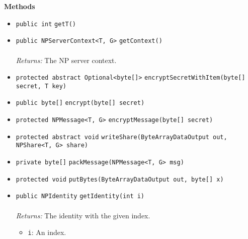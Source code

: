 \textbf{\sffamily Methods}
\begin{itemize}
\item \lstinline|public int| \lstinline|getT|\lstinline|()| \\[-0.6em]




\item \lstinline|public NPServerContext<T, G>| \lstinline|getContext|\lstinline|()|\\ \\[-0.6em]
\emph{Returns:} The NP server context.



\item \lstinline|protected abstract Optional<byte[]>| \lstinline|encryptSecretWithItem|\lstinline|(byte[] secret, T key)| \\[-0.6em]




\item \lstinline|public byte[]| \lstinline|encrypt|\lstinline|(byte[] secret)| \\[-0.6em]




\item \lstinline|protected NPMessage<T, G>| \lstinline|encryptMessage|\lstinline|(byte[] secret)| \\[-0.6em]




\item \lstinline|protected abstract void| \lstinline|writeShare|\lstinline|(ByteArrayDataOutput out, NPShare<T, G> share)| \\[-0.6em]




\item \lstinline|private byte[]| \lstinline|packMessage|\lstinline|(NPMessage<T, G> msg)| \\[-0.6em]




\item \lstinline|protected void| \lstinline|putBytes|\lstinline|(ByteArrayDataOutput out, byte[] x)| \\[-0.6em]




\item \lstinline|public NPIdentity| \lstinline|getIdentity|\lstinline|(int i)|\\ \\[-0.6em]
\emph{Returns:} The identity with the given index.
\begin{itemize}
\item \lstinline|i|: An index.
\end{itemize}




\end{itemize}
